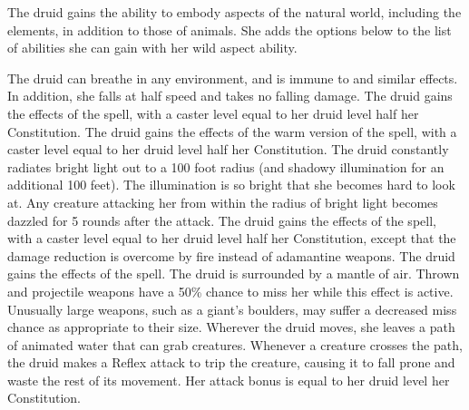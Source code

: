  The druid gains the ability to embody aspects of the natural world, including the elements, in addition to those of animals. She adds the options below to the list of abilities she can gain with her wild aspect ability.

 The druid can breathe in any environment, and is immune to  and similar effects. In addition, she falls at half speed and takes no falling damage.
 The druid gains the effects of the  spell, with a caster level equal to her druid level \add half her Constitution.
 The druid gains the effects of the warm version of the  spell, with a caster level equal to her druid level \add half her Constitution.
 The druid constantly radiates bright light out to a 100 foot radius (and shadowy illumination for an additional 100 feet). The illumination is so bright that she becomes hard to look at. Any creature attacking her from within the radius of bright light becomes dazzled for 5 rounds after the attack.
 The druid gains the effects of the  spell, with a caster level equal to her druid level \add half her Constitution, except that the damage reduction is overcome by fire instead of adamantine weapons.
 The druid gains the effects of the  spell.
  The druid is surrounded by a mantle of air. Thrown and projectile weapons have a 50\% chance to miss her while this effect is active. Unusually large weapons, such as a giant's boulders, may suffer a decreased miss chance as appropriate to their size.
  Wherever the druid moves, she leaves a path of animated water that can grab creatures. Whenever a creature crosses the path, the druid makes a Reflex attack to trip the creature, causing it to fall prone and waste the rest of its movement. Her attack bonus is equal to her druid level \add her Constitution.
